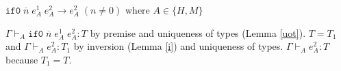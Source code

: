 \begin{case}
$\mathtt{if0}\;\overline{n}\;e_{A}^{1}\;e_{A}^{2}\rightarrow e_{A}^{2}\;(n\neq0)$ where $A\in\lbrace H,M\rbrace$

$\Gamma\vdash_{A}\mathtt{if0}\;\overline{n}\;e_{A}^{1}\;e_{A}^{2}:T$ by premise and uniqueness of types (Lemma \ref{uot}).  $T=T_{1}$ and $\Gamma\vdash_{A}e_{A}^{2}:T_{1}$ by inversion (Lemma \ref{i}) and uniqueness of types.  $\Gamma\vdash_{A}e_{A}^{2}:T$ because $T_{1}=T$.
\end{case}